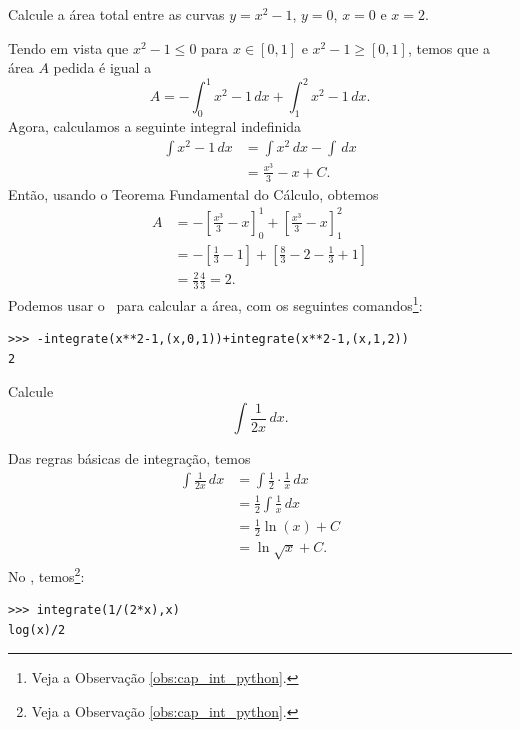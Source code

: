 \begin{exeresol}
  Calcule a área total entre as curvas $y=x^2-1$, $y=0$, $x=0$ e $x=2$.
\end{exeresol}
\begin{resol}
  Tendo em vista que $x^2-1\leq 0$ para $x\in [0, 1]$ e $x^2-1\geq [0, 1]$, temos que a área $A$ pedida é igual a
  \begin{equation}
    A = -\int_0^1 x^2 -1\,dx + \int_1^2 x^2-1\,dx.
  \end{equation}
  Agora, calculamos a seguinte integral indefinida
  \begin{align}
    \int x^2 - 1\,dx &= \int x^2\,dx - \int\,dx \\
                     &= \frac{x^3}{3} - x + C.
  \end{align}
  Então, usando o Teorema Fundamental do Cálculo, obtemos
  \begin{align}
    A &= -\left[\frac{x^3}{3}-x\right]_0^1 + \left[\frac{x^3}{3}-x\right]_1^2\\
      &= - \left[\frac{1}{3}-1\right] + \left[\frac{8}{3} - 2 - \frac{1}{3} + 1\right] \\
      &= \frac{2}{3} \frac{4}{3} = 2.
  \end{align}
\ifispython
Podemos usar o \sympy~para calcular a área, com os seguintes comandos\footnote{Veja a Observação \ref{obs:cap_int_python}.}:
\begin{verbatim}
>>> -integrate(x**2-1,(x,0,1))+integrate(x**2-1,(x,1,2))
2
\end{verbatim}
\fi  
\end{resol}

\begin{exeresol}
  Calcule
  \begin{equation}
    \int \frac{1}{2x}\,dx.
  \end{equation}
\end{exeresol}
\begin{resol}
  Das regras básicas de integração, temos
  \begin{align}
    \int \frac{1}{2x}\,dx &= \int \frac{1}{2}\cdot\frac{1}{x}\,dx \\
                          &= \frac{1}{2}\int\frac{1}{x}\,dx \\
                          &= \frac{1}{2}\ln(x) + C \\
                          &= \ln\sqrt{x} + C.
  \end{align}
\ifispython
No \sympy, temos\footnote{Veja a Observação \ref{obs:cap_int_python}.}:
\begin{verbatim}
>>> integrate(1/(2*x),x)
log(x)/2
\end{verbatim}
\fi    
\end{resol}


